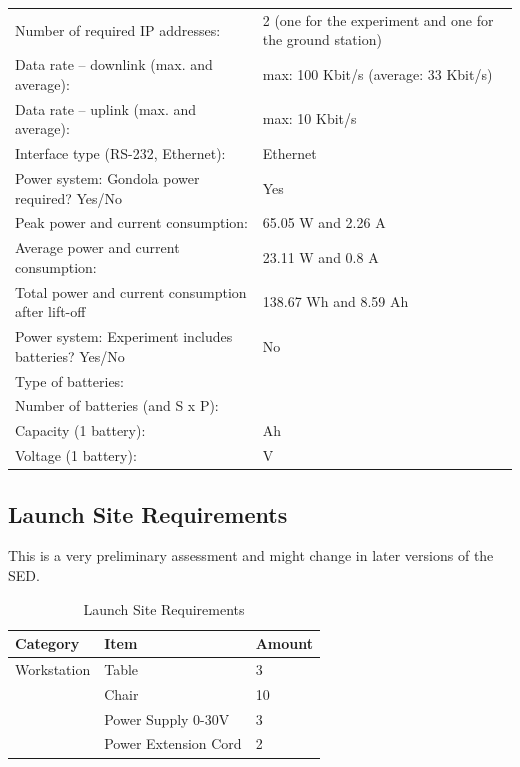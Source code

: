 \documentclass[ %
  a4paper, %
  11pt, %
  openany, %
  parskip, %
  toc=totoc, %
  listof=totoc, %
  bibliography=totoc %
]{scrreprt} %
\providecommand{\DIFdelbegin}{} %
\providecommand{\DIFaddbeginFL}{} %
\providecommand{\DIFaddendFL}{} %
\providecommand{\DIFdelendFL}{} %
\providecommand{\DIFscaledelfig}{0.5}
\newlength{\DIFdelgraphicswidth} %
\newlength{\DIFdelgraphicsheight} %
\providecommand{\DIFaddincludegraphics}[2][]{{\color{blue}\fbox{\DIFOincludegraphics[#1]{#2}}}} %
\providecommand{\DIFdelincludegraphics}[2][]{%
\sbox{\DIFdelgraphicsbox}{\DIFOincludegraphics[#1]{#2}}%
\settoboxwidth{\DIFdelgraphicswidth}{\DIFdelgraphicsbox} %
\settoboxtotalheight{\DIFdelgraphicsheight}{\DIFdelgraphicsbox} %
\scalebox{\DIFscaledelfig}{%
\parbox[b]{\DIFdelgraphicswidth}{\usebox{\DIFdelgraphicsbox}\\[-\baselineskip] \rule{\DIFdelgraphicswidth}{0em}}\llap{\resizebox{\DIFdelgraphicswidth}{\DIFdelgraphicsheight}{%
\setlength{\unitlength}{\DIFdelgraphicswidth}%
\begin{picture}(1,1)%
\thicklines\linethickness{2pt} %
{\color[rgb]{1,0,0}\put(0,0){\framebox(1,1){}}}%
{\color[rgb]{1,0,0}\put(0,0){\line( 1,1){1}}}%
{\color[rgb]{1,0,0}\put(0,1){\line(1,-1){1}}}%
\end{picture}%
}\hspace*{3pt}}} %
} %
\DeclareRobustCommand{\DIFdelbegin}{\DIFOdelbegin \let\includegraphics\DIFdelincludegraphics} %
\DeclareRobustCommand{\DIFaddbeginFL}{\DIFOaddbeginFL \let\includegraphics\DIFaddincludegraphics} %
\DeclareRobustCommand{\DIFaddendFL}{\DIFOaddendFL \let\includegraphics\DIFOincludegraphics} %
\DeclareRobustCommand{\DIFdelendFL}{\DIFOaddendFL \let\includegraphics\DIFOincludegraphics} %
\begin{document}
\begin{table}[htbp]
\begin{tabular}{p{10cm} p{5cm}}
Number of required IP addresses: & 2 (one for the experiment and one for the ground station)\\
Data rate -- downlink (max. and average): & max: 100 Kbit/s  (average: 33 Kbit/s) \\
Data rate -- uplink (max. and average): & max: 10 Kbit/s \\
Interface type (RS-232, Ethernet): & Ethernet \\
\midrule
Power system: Gondola power required? Yes/No & Yes\\
Peak power and current consumption: & 65.05 W and 2.26 A \\
Average power and current consumption: & 23.11 W and 0.8 A \\
Total power and current consumption after lift-off & 138.67 Wh and 8.59 Ah \\
\midrule
Power system: Experiment includes batteries? Yes/No & No\\
Type of batteries: & \\
Number of batteries (and S x P): & \\
Capacity (1 battery): & Ah \\
Voltage (1 battery): & V \\
\bottomrule
\end{tabular}\DIFaddendFL 
\end{table}
\clearpage

\subsection{Launch Site Requirements}
This is a very preliminary assessment and might change in later versions of the SED.
\DIFdelbegin %
\DIFdelendFL \DIFaddbeginFL \begin{table}[htbp]
\DIFaddendFL \centering
\caption{Launch Site Requirements}
\label{tab:launch_site_req}
\begin{tabular}{lll}
\toprule
\textbf{Category} & \textbf{Item} & \textbf{Amount} \\
\midrule
Workstation&Table & 3 \\
 &Chair & 10 \\
 &Power Supply 0-30V & 3\\
 &Power Extension Cord & 2 \\

\bottomrule
\end{tabular}
\end{table}
\clearpage
\end{document}
